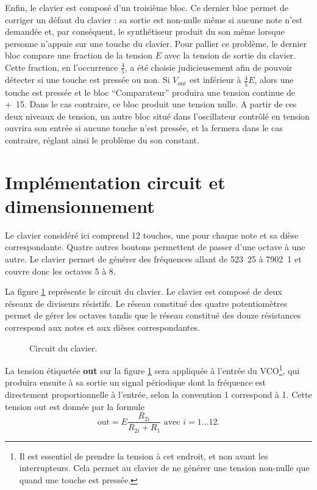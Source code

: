 Enfin, le clavier est composé d'un troisième bloc. Ce dernier bloc permet
de corriger un défaut du clavier : sa sortie est non-nulle même si aucune
note n'est demandée et, par conséquent, le synthétiseur produit du son
même lorsque personne n’appuie sur une touche du clavier. Pour pallier
ce problème, le dernier bloc compare une fraction de la tension $E$ avec la
tension de sortie du clavier. Cette fraction, en l’occurrence 
$\frac{4}{5}$, a été choisie judicieusement afin de pouvoir détecter
si une touche est pressée ou non. Si $V_{\text{out}}$ est inférieur à
$\frac{4}{5}E$, alors une touche est pressée et le bloc ``Comparateur''
produira une tension continue de \unit{+15}{\volt}. Dans le cas contraire,
ce bloc produit une tension nulle. A partir de ces deux niveaux de tension,
un autre bloc situé dans l'oscillateur contrôlé en tension ouvrira son entrée
si aucune touche n'est pressée, et la fermera dans le cas contraire, réglant
ainsi le problème du son constant.
 
\section{Implémentation circuit et dimensionnement}
Le clavier considéré ici comprend 12 touches, une pour
chaque note et sa dièse correspondante. Quatre autres
boutons permettent de passer d'une octave à une autre.
Le clavier permet de générer des fréquences allant de
\unit{523.25}{\hertz} à \unit{7902.1}{\hertz} et couvre
donc les octaves 5 à 8.

La figure \ref{fig:keyboard-circuit} représente le
circuit du clavier. Le clavier est composé de deux
réseaux de diviseurs résistifs. Le réseau constitué
des quatre potentiomètres permet de gérer les octaves
tandis que le réseau constitué des douze résistances
correspond aux notes et aux dièses correspondantes.

\begin{figure}[ht]
	\centering
	\caption{Circuit du clavier.}
	\label{fig:keyboard-circuit}
\end{figure}

La tension étiquetée \textbf{out} sur la figure
\ref{fig:keyboard-circuit} sera appliquée à l'entrée
du VCO\footnote{Il est essentiel de prendre la tension à cet
endroit, et non avant les interrupteurs. Cela permet au clavier
de ne générer une tension non-nulle que quand une touche est pressée.},
qui produira ensuite à sa sortie un signal
périodique dont la fréquence est directement 
proportionnelle à l'entrée, selon la convention
\unit{1}{\milli\volt} correspond à \unit{1}{\hertz}. Cette
tension $\text{out}$ est donnée par la formule 
\[ \text{out} = E\frac{R_{2i}}{R_{2i} + R_1} \text{  avec  } i = 1\dots12. \]

